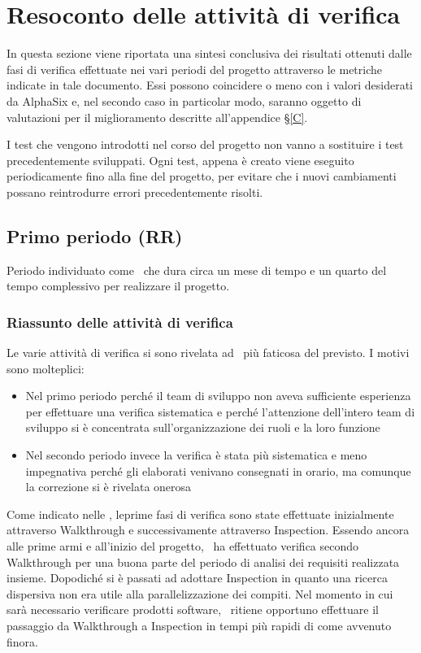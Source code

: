 \newpage
\section{Resoconto delle attività di verifica} \label{resoconto attività di verifica}
In questa sezione viene riportata una sintesi conclusiva dei risultati ottenuti dalle fasi di verifica effettuate nei vari periodi del progetto attraverso le metriche indicate in tale documento. Essi possono coincidere o meno con i valori desiderati da AlphaSix e, nel secondo caso in particolar modo, saranno oggetto di valutazioni per il miglioramento descritte all'appendice \S\ref{C}.

I test che vengono introdotti nel corso del progetto non vanno a sostituire i test precedentemente sviluppati. Ogni test, appena è creato viene eseguito periodicamente fino alla fine del progetto, per evitare che i nuovi cambiamenti possano reintrodurre errori precedentemente risolti.

	\subsection{Primo periodo (RR)}
	Periodo individuato come \AdR\ che dura circa un mese di tempo e un quarto del tempo complessivo per realizzare il progetto.
	
	    \subsubsection{Riassunto delle attività di verifica}
	    Le varie attività di verifica si sono rivelata ad \gruppo\ più faticosa del previsto. I motivi sono molteplici:
	    	\begin{itemize}
	    		\item Nel primo periodo perché il team di sviluppo non aveva sufficiente esperienza per effettuare una verifica sistematica e perché l'attenzione dell'intero team di sviluppo si è concentrata sull'organizzazione dei ruoli e la loro funzione
	    		\item Nel secondo periodo invece la verifica è stata più sistematica e meno impegnativa perché gli elaborati venivano consegnati in orario, ma comunque la correzione si è rivelata onerosa
	    	\end{itemize}
	    
	
	    Come indicato nelle \NdPd, leprime fasi di verifica sono state effettuate inizialmente attraverso Walkthrough e successivamente attraverso Inspection. Essendo ancora alle prime armi e all'inizio del progetto, \gruppo\ ha effettuato verifica secondo Walkthrough per una buona parte del periodo di analisi dei requisiti realizzata insieme. Dopodiché si è passati ad adottare Inspection in quanto una ricerca dispersiva non era utile alla parallelizzazione dei compiti. 
	    Nel momento in cui sarà necessario verificare prodotti software, \gruppo\ ritiene opportuno effettuare il passaggio da Walkthrough a Inspection in tempi più rapidi di come avvenuto finora.
	    

